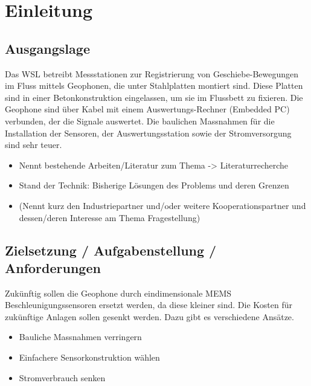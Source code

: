 %
%

\chapter{Einleitung}\label{chap.einleitung}



\section{Ausgangslage}\label{ausgangslage}
Das WSL betreibt Messstationen zur Registrierung von Geschiebe-Bewegungen im Fluss mittels Geophonen, die unter Stahlplatten montiert sind. Diese Platten sind in einer Betonkonstruktion eingelassen, um sie im Flussbett zu fixieren. Die Geophone sind über Kabel mit einem Auswertungs-Rechner (Embedded PC) verbunden, der die Signale auswertet. Die baulichen Massnahmen für die Installation der Sensoren, der Auswertungsstation sowie der Stromversorgung sind sehr teuer. 


\begin{itemize}
\item Nennt bestehende Arbeiten/Literatur zum Thema -> Literaturrecherche
\item Stand der Technik: Bisherige Lösungen des Problems und deren Grenzen
\item (Nennt kurz den Industriepartner und/oder weitere Kooperationspartner und dessen/deren Interesse am Thema Fragestellung)
\end{itemize}



\section{Zielsetzung / Aufgabenstellung / Anforderungen}\label{zielsetzung}
Zukünftig sollen die Geophone durch eindimensionale MEMS Beschleunigungssensoren ersetzt werden, da diese kleiner sind.
Die Kosten für zukünftige Anlagen sollen gesenkt werden. Dazu gibt es verschiedene Ansätze.
\begin{itemize}
\item Bauliche Massnahmen verringern
\item Einfachere Sensorkonstruktion wählen
\item Stromverbrauch senken
\end{itemize}

